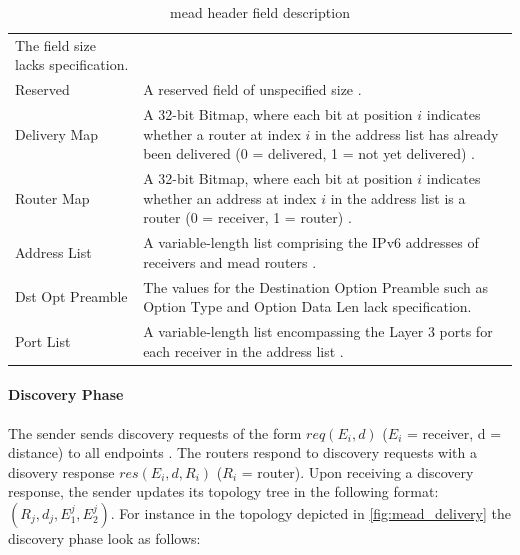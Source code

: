 \begin{table}[!htbp]
\begin{tabularx}{\textwidth}{lX}
                The field size lacks specification.\\
Reserved      & A reserved field of unspecified size \cite{meadcast2}. \\
Delivery Map  & A 32-bit Bitmap, where each bit at position $i$ indicates
                whether a router at index $i$ in the address list has already
                been delivered (0 = delivered, 1 = not yet delivered)
                \cite{meadcast2}. \\
Router Map    & A 32-bit Bitmap, where each bit at position $i$ indicates
                whether an address at index $i$ in the address list is a
                router (0 = receiver, 1 = router) \cite{meadcast2}.\\
Address List  & A variable-length list comprising the IPv6 addresses of
                receivers and \gls{mead} routers \cite{meadcast2}. \\ \midrule
Dst Opt Preamble & The values for the Destination Option Preamble such as
                    Option Type and Option Data Len lack specification. \\
Port List     & A variable-length list encompassing the Layer 3 ports for each
                receiver in the address list \cite{meadcast2}.\\
\bottomrule
\end{tabularx}
    \caption[MEADcast header field description]{\gls{mead} header field description}
\label{tab:02_meadcast_header}
\end{table}
\egroup

\paragraph{Discovery Phase} %
\label{par:Discovery Phase}
The sender sends discovery requests of the form $req(E_i, d)$ ($E_i$ =
    receiver, d = distance) to all endpoints \cite{meadcast1}.
The routers respond to discovery requests with a disovery response
    $res(E_i, d, R_i)$ ($R_i$ = router).
Upon receiving a discovery response, the sender updates its topology tree in
    the following format: $(R_j,d_j,E_1^j,E_2^j)$.
For instance in the topology depicted in \autoref{fig:mead_delivery} the
    discovery phase look as follows:

